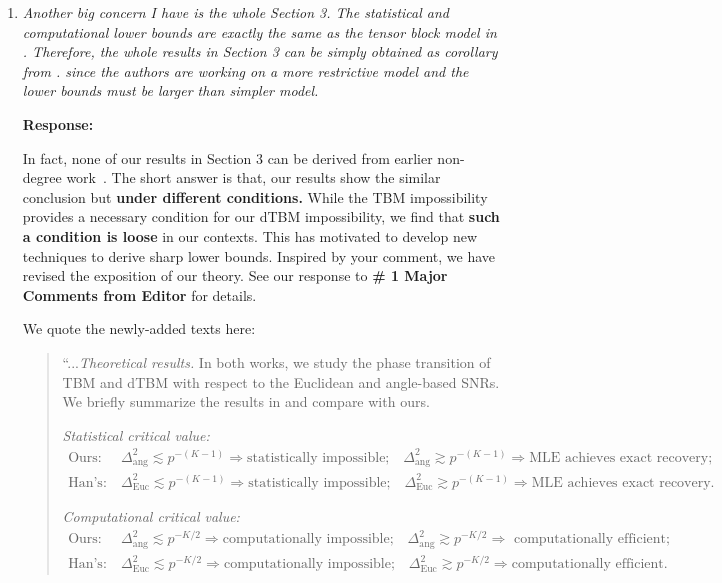 \documentclass[11pt]{article}
\theoremstyle{definition}
\theoremstyle{definition}
\begin{document}
\begin{enumerate}[wide, labelwidth=!, labelindent=0pt]
\begin{enumerate}
\end{enumerate}
\item \textit{Another big concern I have is the whole Section 3. The statistical and computational lower bounds are exactly the same as the tensor block model in \cite{han2020exact}. Therefore, the whole results in Section 3 can be simply obtained as corollary from \cite{han2020exact}. since the authors are working on a more restrictive model and the lower bounds must be larger than simpler model.}

\textbf{Response:} 

In fact, none of our results in Section 3 can be derived from earlier non-degree work~\citep{han2020exact}. The short answer is that, our results show the similar conclusion but {\bf under different conditions.} While the TBM impossibility~\citep{han2020exact} provides a necessary condition for our dTBM impossibility, we find that {\bf such a condition is loose} in our contexts. This has motivated to develop new techniques to derive sharp lower bounds. 
Inspired by your comment, we have revised the exposition of our theory. See our response to \textbf{\# 1 Major Comments from Editor} for details.

We quote the newly-added texts here:
\begin{quote}
    ``...\emph{Theoretical results.} In both works, we study the phase transition of TBM and dTBM with respect to the Euclidean and angle-based SNRs. We briefly summarize the results in \cite{han2020exact} and compare with ours. 
    
    \textit{Statistical critical value:}
    \begin{align}
        \text{Ours:}& \ \Delta_{\text{ang}}^2 \lesssim p^{-(K-1)} \Rightarrow \text{statistically impossible;} \quad \Delta_{\text{ang}}^2 \gtrsim   p^{-(K-1)} \Rightarrow \text{MLE achieves exact recovery;} \\
        \text{Han's:}& \ \Delta_{\text{Euc}}^2 \lesssim p^{-(K-1)} \Rightarrow \text{statistically impossible;} \quad \Delta_{\text{Euc}}^2 \gtrsim   p^{-(K-1)} \Rightarrow \text{MLE achieves exact recovery}.
    \end{align}
    
     \textit{Computational critical value:}
    \begin{align}
        \text{Ours:}& \ \Delta_{\text{ang}}^2 \lesssim p^{-K/2} \Rightarrow \text{computationally impossible;} \quad \Delta_{\text{ang}}^2 \gtrsim   p^{-K/2} \Rightarrow \text{ computationally efficient;} \\
        \text{Han's:}& \ \Delta_{\text{Euc}}^2 \lesssim p^{-K/2} \Rightarrow \text{computationally impossible;} \quad \Delta_{\text{Euc}}^2 \gtrsim   p^{-K/2} \Rightarrow \text{computationally efficient}.
    \end{align}
    

\end{quote}
\end{enumerate}
\end{document}
